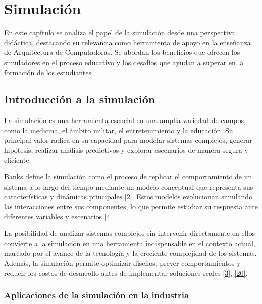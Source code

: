 \documentclass[12pt,oneside]{templates/unerthesis}
\begin{document}
\hypertarget{simulacion}{%
\chapter{Simulación}\label{simulacion}}

En este capítulo se analiza el papel de la simulación desde una perspectiva didáctica, destacando su relevancia como herramienta de apoyo en la enseñanza de Arquitectura de Computadoras. Se abordan los beneficios que ofrecen los simuladores en el proceso educativo y los desafíos que ayudan a superar en la formación de los estudiantes.

\hypertarget{introducciuxf3n-a-la-simulaciuxf3n}{%
\section{Introducción a la simulación}\label{introducciuxf3n-a-la-simulaciuxf3n}}

La simulación es una herramienta esencial en una amplia variedad de campos, como la medicina, el ámbito militar, el entretenimiento y la educación. Su principal valor radica en su capacidad para modelar sistemas complejos, generar hipótesis, realizar análisis predictivos y explorar escenarios de manera segura y eficiente.

Banks define la simulación como el proceso de replicar el comportamiento de un sistema a lo largo del tiempo mediante un modelo conceptual que representa sus características y dinámicas principales \protect\hyperlink{ref-banks_discrete-event_2010}{{[}2{]}}. Estos modelos evolucionan simulando las interacciones entre sus componentes, lo que permite estudiar su respuesta ante diferentes variables y escenarios \protect\hyperlink{ref-robinson_simulation_2014}{{[}4{]}}.

La posibilidad de analizar sistemas complejos sin intervenir directamente en ellos convierte a la simulación en una herramienta indispensable en el contexto actual, marcado por el avance de la tecnología y la creciente complejidad de los sistemas. Además, la simulación permite optimizar diseños, prever comportamientos y reducir los costos de desarrollo antes de implementar soluciones reales \protect\hyperlink{ref-law_simulation_2015}{{[}3{]}}, \protect\hyperlink{ref-zeigler_theory_2000}{{[}20{]}}.

\hypertarget{aplicaciones-de-la-simulaciuxf3n-en-la-industria}{%
\subsection{Aplicaciones de la simulación en la industria}\label{aplicaciones-de-la-simulaciuxf3n-en-la-industria}}
\end{document}
